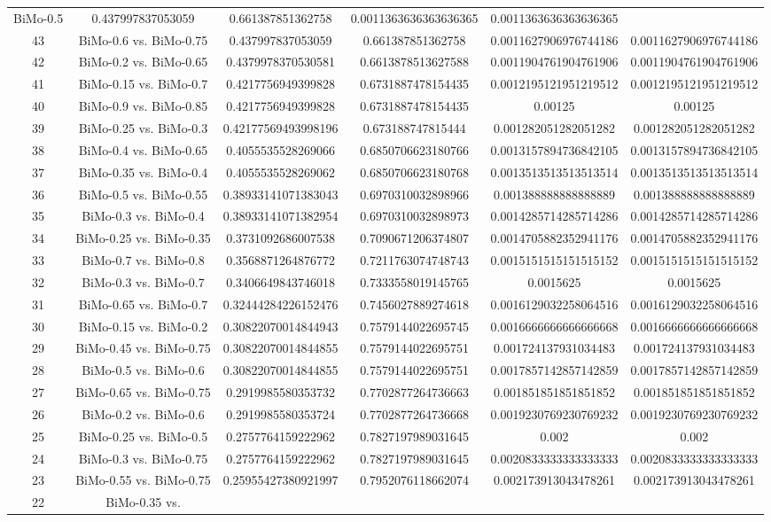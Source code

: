 \documentclass[a4paper,10pt]{article}
\begin{document}
\begin{landscape}
\begin{table}[!htp]
\begin{tabular}{cccccc}
BiMo-0.5&0.437997837053059&0.661387851362758&0.0011363636363636365&0.0011363636363636365\\43&BiMo-0.6 vs. BiMo-0.75&0.437997837053059&0.661387851362758&0.0011627906976744186&0.0011627906976744186\\42&BiMo-0.2 vs. BiMo-0.65&0.4379978370530581&0.6613878513627588&0.0011904761904761906&0.0011904761904761906\\41&BiMo-0.15 vs. BiMo-0.7&0.4217756949399828&0.6731887478154435&0.0012195121951219512&0.0012195121951219512\\40&BiMo-0.9 vs. BiMo-0.85&0.4217756949399828&0.6731887478154435&0.00125&0.00125\\39&BiMo-0.25 vs. BiMo-0.3&0.42177569493998196&0.673188747815444&0.001282051282051282&0.001282051282051282\\38&BiMo-0.4 vs. BiMo-0.65&0.4055535528269066&0.6850706623180766&0.0013157894736842105&0.0013157894736842105\\37&BiMo-0.35 vs. BiMo-0.4&0.4055535528269062&0.6850706623180768&0.0013513513513513514&0.0013513513513513514\\36&BiMo-0.5 vs. BiMo-0.55&0.38933141071383043&0.6970310032898966&0.001388888888888889&0.001388888888888889\\35&BiMo-0.3 vs. BiMo-0.4&0.38933141071382954&0.6970310032898973&0.0014285714285714286&0.0014285714285714286\\34&BiMo-0.25 vs. BiMo-0.35&0.3731092686007538&0.7090671206374807&0.0014705882352941176&0.0014705882352941176\\33&BiMo-0.7 vs. BiMo-0.8&0.3568871264876772&0.7211763074748743&0.0015151515151515152&0.0015151515151515152\\32&BiMo-0.3 vs. BiMo-0.7&0.3406649843746018&0.7333558019145765&0.0015625&0.0015625\\31&BiMo-0.65 vs. BiMo-0.7&0.32444284226152476&0.7456027889274618&0.0016129032258064516&0.0016129032258064516\\30&BiMo-0.15 vs. BiMo-0.2&0.30822070014844943&0.7579144022695745&0.0016666666666666668&0.0016666666666666668\\29&BiMo-0.45 vs. BiMo-0.75&0.30822070014844855&0.7579144022695751&0.001724137931034483&0.001724137931034483\\28&BiMo-0.5 vs. BiMo-0.6&0.30822070014844855&0.7579144022695751&0.0017857142857142859&0.0017857142857142859\\27&BiMo-0.65 vs. BiMo-0.75&0.2919985580353732&0.7702877264736663&0.001851851851851852&0.001851851851851852\\26&BiMo-0.2 vs. BiMo-0.6&0.2919985580353724&0.7702877264736668&0.0019230769230769232&0.0019230769230769232\\25&BiMo-0.25 vs. BiMo-0.5&0.2757764159222962&0.7827197989031645&0.002&0.002\\24&BiMo-0.3 vs. BiMo-0.75&0.2757764159222962&0.7827197989031645&0.0020833333333333333&0.0020833333333333333\\23&BiMo-0.55 vs. BiMo-0.75&0.25955427380921997&0.7952076118662074&0.002173913043478261&0.002173913043478261\\22&BiMo-0.35 vs. 
\end{tabular}
\end{table}
\end{landscape}
\end{document}
